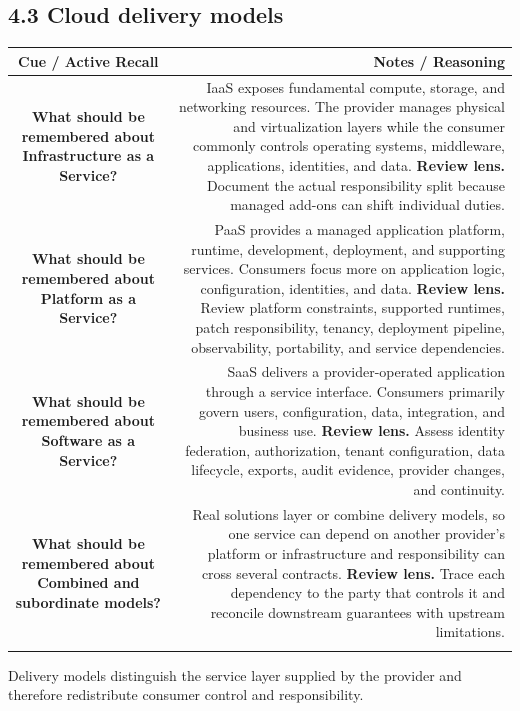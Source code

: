 \documentclass[11pt]{article}
\newcommand{\CornellHeader}{\rowcolor{Navy}\color{white}\bfseries Cue / Active Recall & \color{white}\bfseries Notes / Reasoning \\\endhead}
\newcommand{\CornellRow}[2]{\cellcolor{CueGray}\textbf{#1} & #2 \\\addlinespace[3pt]}
\begin{document}
\subsection{4.3 Cloud delivery models}
\begin{longtable}{@{}C N@{}}
\CornellHeader
\CornellRow{What should be remembered about Infrastructure as a Service?}{IaaS exposes fundamental compute, storage, and networking resources. The provider manages physical and virtualization layers while the consumer commonly controls operating systems, middleware, applications, identities, and data. \textbf{Review lens.} Document the actual responsibility split because managed add-ons can shift individual duties.}
\CornellRow{What should be remembered about Platform as a Service?}{PaaS provides a managed application platform, runtime, development, deployment, and supporting services. Consumers focus more on application logic, configuration, identities, and data. \textbf{Review lens.} Review platform constraints, supported runtimes, patch responsibility, tenancy, deployment pipeline, observability, portability, and service dependencies.}
\CornellRow{What should be remembered about Software as a Service?}{SaaS delivers a provider-operated application through a service interface. Consumers primarily govern users, configuration, data, integration, and business use. \textbf{Review lens.} Assess identity federation, authorization, tenant configuration, data lifecycle, exports, audit evidence, provider changes, and continuity.}
\CornellRow{What should be remembered about Combined and subordinate models?}{Real solutions layer or combine delivery models, so one service can depend on another provider's platform or infrastructure and responsibility can cross several contracts. \textbf{Review lens.} Trace each dependency to the party that controls it and reconcile downstream guarantees with upstream limitations.}
\end{longtable}
\begin{sectionsummarybox}
Delivery models distinguish the service layer supplied by the provider and therefore redistribute consumer control and responsibility.
\end{sectionsummarybox}
\end{document}

